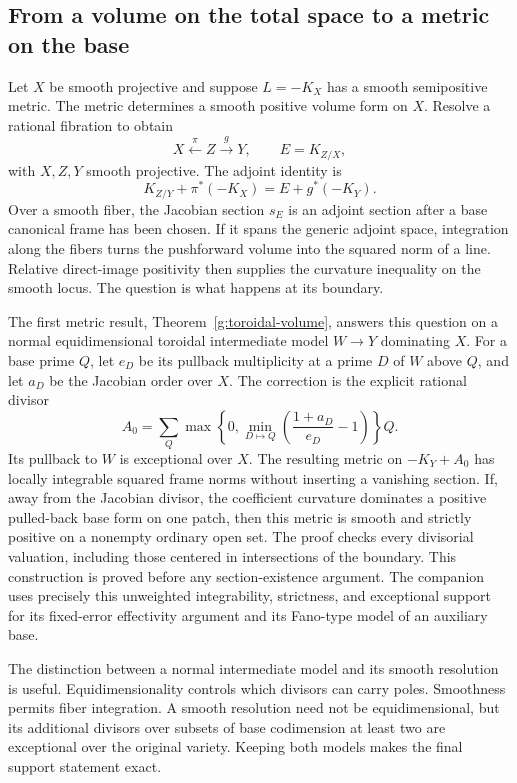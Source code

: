 \subsection{From a volume on the total space to a metric on the base}

Let $X$ be smooth projective and suppose $L=-K_X$ has a smooth
semipositive metric. The metric determines a smooth positive volume
form on $X$. Resolve a rational fibration to obtain
\[
 X\xleftarrow{\ \pi\ } Z\xrightarrow{\ g\ }Y,
 \qquad E=K_{Z/X},
\]
with $X,Z,Y$ smooth projective. The adjoint identity is
\[K_{Z/Y}+\pi^*(-K_X)=E+g^*(-K_Y).\]
Over a smooth fiber, the Jacobian section
$s_E$ is an adjoint section after a base canonical frame has been
chosen. If it spans the generic adjoint space, integration along the
fibers turns the pushforward volume into the squared norm of a line.
Relative direct-image positivity then supplies the curvature inequality
on the smooth locus. The question is what happens at its boundary.

The first metric result, Theorem~\ref{g:toroidal-volume}, answers this question
on a normal equidimensional toroidal intermediate model
$W\to Y$ dominating $X$. For a base prime $Q$, let $e_D$ be its pullback
multiplicity at a prime $D$ of $W$ above $Q$, and let $a_D$ be the
Jacobian order over $X$. The correction is the explicit rational divisor
\[
 A_0=\sum_Q
 \max\left\{0,\min_{D\mapsto Q}
          \left(\frac{1+a_D}{e_D}-1\right)\right\}Q.
\]
Its pullback to $W$ is exceptional over $X$. The resulting metric on
$-K_Y+A_0$ has locally integrable squared frame norms without inserting
a vanishing section. If, away from the Jacobian divisor, the coefficient
curvature dominates a positive pulled-back base form on one patch,
then this metric is smooth and strictly positive on a nonempty ordinary
open set. The proof checks every divisorial valuation, including those
centered in intersections of the boundary. This construction is proved
before any section-existence argument. The companion
\cite[Sections~5.3 and~11.2]{EControlledBoundary} uses precisely this
unweighted integrability, strictness, and exceptional support for its
fixed-error effectivity argument and its Fano-type model of an auxiliary
base.

The distinction between a normal intermediate model and its smooth
resolution is useful. Equidimensionality controls which divisors can
carry poles. Smoothness permits fiber integration. A smooth resolution
need not be equidimensional, but its additional divisors over subsets of
base codimension at least two are exceptional over the original variety.
Keeping both models makes the final support statement exact.

